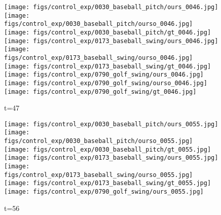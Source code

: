 \documentclass{article}
\begin{document}
\begin{appendix}
\begin{figure*}[!thbp]
	\begin{subfigure}{0.12\linewidth}
        \caption*{t=47}
        \vspace{-7pt}
	    \texttt{[image: figs/control\_exp/0030\_baseball\_pitch/ours\_0046.jpg]}
	    \texttt{[image: figs/control\_exp/0030\_baseball\_pitch/ourso\_0046.jpg]}
	    \vspace{.2cm}
  		\texttt{[image: figs/control\_exp/0030\_baseball\_pitch/gt\_0046.jpg]}
  		\texttt{[image: figs/control\_exp/0173\_baseball\_swing/ours\_0046.jpg]}
  		\texttt{[image: figs/control\_exp/0173\_baseball\_swing/ourso\_0046.jpg]}
  		\vspace{.2cm}
  		\texttt{[image: figs/control\_exp/0173\_baseball\_swing/gt\_0046.jpg]}
  		\texttt{[image: figs/control\_exp/0790\_golf\_swing/ours\_0046.jpg]}
  		\texttt{[image: figs/control\_exp/0790\_golf\_swing/ourso\_0046.jpg]}
  		\vspace{.2cm}
  		\texttt{[image: figs/control\_exp/0790\_golf\_swing/gt\_0046.jpg]}
	\end{subfigure}
	\begin{subfigure}{0.12\linewidth}
        \caption*{t=56}
        \vspace{-7pt}
	    \texttt{[image: figs/control\_exp/0030\_baseball\_pitch/ours\_0055.jpg]}
	    \texttt{[image: figs/control\_exp/0030\_baseball\_pitch/ourso\_0055.jpg]}
	    \vspace{.2cm}
  		\texttt{[image: figs/control\_exp/0030\_baseball\_pitch/gt\_0055.jpg]}
  		\texttt{[image: figs/control\_exp/0173\_baseball\_swing/ours\_0055.jpg]}
  		\texttt{[image: figs/control\_exp/0173\_baseball\_swing/ourso\_0055.jpg]}
  		\vspace{.2cm}
  		\texttt{[image: figs/control\_exp/0173\_baseball\_swing/gt\_0055.jpg]}
  		\texttt{[image: figs/control\_exp/0790\_golf\_swing/ours\_0055.jpg]}

\end{subfigure}
\end{figure*}
\end{appendix}
\end{document}
